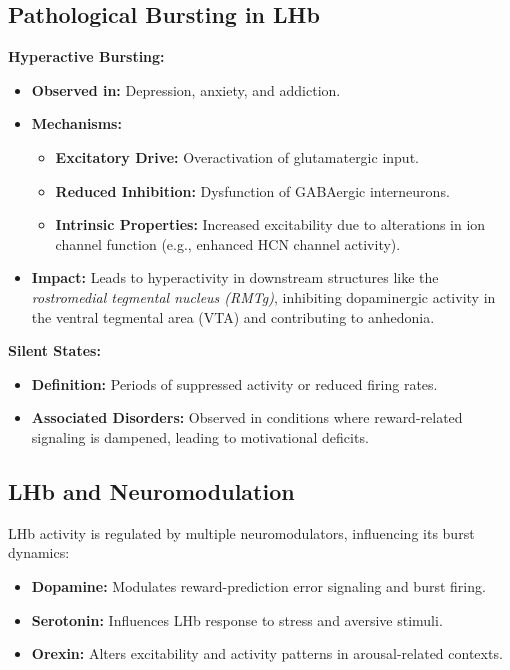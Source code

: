 \documentclass[a4paper,9pt]{extarticle}
\begin{document}
\subsection{Pathological Bursting in LHb}
\textbf{Hyperactive Bursting:}
\begin{itemize}
    \item \textbf{Observed in:} Depression, anxiety, and addiction.
    \item \textbf{Mechanisms:}
    \begin{itemize}
        \item \textbf{Excitatory Drive:} Overactivation of glutamatergic input.
        \item \textbf{Reduced Inhibition:} Dysfunction of GABAergic interneurons.
        \item \textbf{Intrinsic Properties:} Increased excitability due to alterations in ion channel function (e.g., enhanced HCN channel activity).
    \end{itemize}
    \item \textbf{Impact:} Leads to hyperactivity in downstream structures like the \textit{rostromedial tegmental nucleus (RMTg)}, inhibiting dopaminergic activity in the ventral tegmental area (VTA) and contributing to anhedonia.
\end{itemize}

\textbf{Silent States:}
\begin{itemize}
    \item \textbf{Definition:} Periods of suppressed activity or reduced firing rates.
    \item \textbf{Associated Disorders:} Observed in conditions where reward-related signaling is dampened, leading to motivational deficits.
\end{itemize}

\subsection{LHb and Neuromodulation}
LHb activity is regulated by multiple neuromodulators, influencing its burst dynamics:
\begin{itemize}
    \item \textbf{Dopamine:} Modulates reward-prediction error signaling and burst firing.
    \item \textbf{Serotonin:} Influences LHb response to stress and aversive stimuli.
    \item \textbf{Orexin:} Alters excitability and activity patterns in arousal-related contexts.
\end{itemize}
\end{document}
